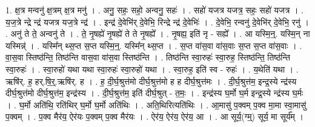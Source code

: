 \documentclass[17pt]{extarticle}
\begin{document}
1. क्ष॒त्र मन्वनु॑ क्ष॒त्रम् क्ष॒त्र मनु॑ । . अनु॒ सहः॒ सहो॒ अन्वनु॒ सहः॑ । . सहो॑ यजत्र यजत्र॒ सहः॒ सहो॑ यजत्र । . य॒ज॒त्रे न्द्रे न्द्र॑ यजत्र यज॒त्रे न्द्र॑ । . इन्द्र॑ दे॒वेभि॑र् दे॒वेभि॒ रिन्द्रे न्द्र॑ दे॒वेभिः॑ । . दे॒वेभि॒ रन्वनु॑ दे॒वेभि॑र् दे॒वेभि॒ रनु॑ । . अनु॑ ते ते॒ अन्वनु॑ ते । . ते॒ नृ॒षह्ये॑ नृ॒षह्ये॑ ते ते नृ॒षह्ये᳚ । . नृ॒षह्य॒ इति॑ नृ - सह्ये᳚ । . आ यस्मि॒न्॒. यस्मि॒न् ना यस्मिन्न्॑ । . यस्मि᳚न् थ्स॒प्त स॒प्त यस्मि॒न्॒. यस्मि᳚न् थ्स॒प्त । . स॒प्त वा॑स॒वा वा॑स॒वाः स॒प्त स॒प्त वा॑स॒वाः । . वा॒स॒वा स्तिष्ठ॑न्ति॒ तिष्ठ॑न्ति वास॒वा वा॑स॒वा स्तिष्ठ॑न्ति । . तिष्ठ॑न्ति स्वा॒रुहः॑ स्वा॒रुह॒ स्तिष्ठ॑न्ति॒ तिष्ठ॑न्ति स्वा॒रुहः॑ । . स्वा॒रुहो॑ यथा यथा स्वा॒रुहः॑ स्वा॒रुहो॑ यथा । . स्वा॒रुह॒ इति॑ स्व - रुहः॑ । . य॒थेति॑ यथा । . ऋषि॑र्. ह॒ हर्.षि॒र्॒.ऋषि॑र्. ह । . ह॒ दी॒र्घ॒श्रुत्त॑मो दीर्घ॒श्रुत्त॑मो ह ह दीर्घ॒श्रुत्त॑मः । . दी॒र्घ॒श्रुत्त॑म॒ इन्द्र॒स्ये न्द्र॑स्य दीर्घ॒श्रुत्त॑मो दीर्घ॒श्रुत्त॑म॒ इन्द्र॑स्य । . दी॒र्घ॒श्रुत्त॑म॒ इति॑ दीर्घ॒श्रुत् - त॒मः॒ । . इन्द्र॑स्य घ॒र्मो घ॒र्म इन्द्र॒स्ये न्द्र॑स्य घ॒र्मः । . घ॒र्मो अति॑थि॒ रति॑थिर् घ॒र्मो घ॒र्मो अति॑थिः । . अति॒थिरित्यति॑थिः । . आ॒मासु॑ प॒क्वम् प॒क्व मा॒मा स्वा॒मासु॑ प॒क्वम् । . प॒क्व मैर॑य॒ ऐर॑यः प॒क्वम् प॒क्व मैर॑यः । . ऐर॑य॒ ऐर॑य॒ ऐर॑य॒ आ । . आ सूर्य॒(ग्म्॒) सूर्य॒ मा सूर्य᳚म् । \newline
\end{document}
